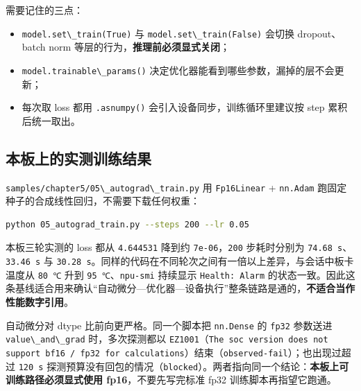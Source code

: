 需要记住的三点：

\begin{itemize}
\tightlist
\item
  \passthrough{\lstinline!model.set\_train(True)!} 与
  \passthrough{\lstinline!model.set\_train(False)!} 会切换
  dropout、batch norm 等层的行为，\textbf{推理前必须显式关闭}；
\item
  \passthrough{\lstinline!model.trainable\_params()!}
  决定优化器能看到哪些参数，漏掉的层不会更新；
\item
  每次取 loss 都用 \passthrough{\lstinline!.asnumpy()!}
  会引入设备同步，训练循环里建议按 step 累积后统一取出。
\end{itemize}

\subsection{本板上的实测训练结果}\label{mindspore-board-training}

\passthrough{\lstinline!samples/chapter5/05\_autograd\_train.py!} 用
\passthrough{\lstinline!Fp16Linear!} + \passthrough{\lstinline!nn.Adam!}
跑固定种子的合成线性回归，不需要下载任何权重：

\begin{lstlisting}[language=bash]
python 05_autograd_train.py --steps 200 --lr 0.05
\end{lstlisting}

本板三轮实测的 loss 都从 \passthrough{\lstinline!4.644531!} 降到约
\passthrough{\lstinline!7e-06!}，\passthrough{\lstinline!200!}
步耗时分别为
\passthrough{\lstinline!74.68 s!}、\passthrough{\lstinline!33.46 s!} 与
\passthrough{\lstinline!30.28 s!}。同样的代码在不同轮次之间有一倍以上差异，与会话中板卡温度从
\passthrough{\lstinline!80 ℃!} 升到
\passthrough{\lstinline!95 ℃!}、\passthrough{\lstinline!npu-smi!}
持续显示 \passthrough{\lstinline!Health: Alarm!}
的状态一致。因此这条基线适合用来确认``自动微分---优化器---设备执行''整条链路是通的，\textbf{不适合当作性能数字引用}。

自动微分对 dtype 比前向更严格。同一个脚本把
\passthrough{\lstinline!nn.Dense!} 的 \passthrough{\lstinline!fp32!}
参数送进 \passthrough{\lstinline!value\_and\_grad!} 时，多次探测都以
\passthrough{\lstinline!EZ1001!}（\passthrough{\lstinline!The soc version does not support bf16 / fp32 for calculations!}）结束（\passthrough{\lstinline!observed-fail!}）；也出现过超过
\passthrough{\lstinline!120 s!}
探测预算没有回包的情况（\passthrough{\lstinline!blocked!}）。两者指向同一个结论：\textbf{本板上可训练路径必须显式使用
fp16}，不要先写完标准 fp32 训练脚本再指望它跑通。

